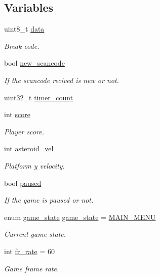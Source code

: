 \subsection*{Variables}
\begin{DoxyCompactItemize}
\item 
uint8\+\_\+t \hyperlink{group__Proj_ga325819a8e492ac69542e8b31705af6e9}{data}
\begin{DoxyCompactList}\small\item\em Break code. \end{DoxyCompactList}\item 
bool \hyperlink{group__Proj_ga96f7c2f0fe863bd78294a8f639e60478}{new\+\_\+scancode}
\begin{DoxyCompactList}\small\item\em If the scancode recived is new or not. \end{DoxyCompactList}\item 
uint32\+\_\+t \hyperlink{group__Proj_gae8397a27149e2f76643db0f712e30e82}{timer\+\_\+count}
\item 
int \hyperlink{group__Proj_gaef160b7437d94056f1dc59646cd5b87d}{score}
\begin{DoxyCompactList}\small\item\em Player score. \end{DoxyCompactList}\item 
int \hyperlink{group__Proj_gae08662d87c59faeaf7d329826dd1a0c7}{asteroid\+\_\+vel}
\begin{DoxyCompactList}\small\item\em Platform y velocity. \end{DoxyCompactList}\item 
bool \hyperlink{group__Proj_ga1656129c4a4fd8809254194f08f0ac70}{paused}
\begin{DoxyCompactList}\small\item\em If the game is paused or not. \end{DoxyCompactList}\item 
enum \hyperlink{group__utils_gad0ed1832dd134806ad335cdcc1a59ad2}{game\+\_\+state} \hyperlink{group__Proj_ga38caf7c28534bcd60ff95faf7fcae2d7}{game\+\_\+state} = \hyperlink{group__utils_ggad0ed1832dd134806ad335cdcc1a59ad2ac22743f1fc74de09544ecc9bab74a17b}{M\+A\+I\+N\+\_\+\+M\+E\+NU}
\begin{DoxyCompactList}\small\item\em Current game state. \end{DoxyCompactList}\item 
int \hyperlink{group__Proj_ga38b3017ff237979dfb1f8bac080e8b74}{fr\+\_\+rate} = 60
\begin{DoxyCompactList}\small\item\em Game frame rate. \end{DoxyCompactList}\end{DoxyCompactItemize}


